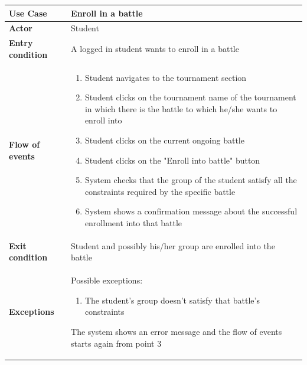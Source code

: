 \documentclass[../RASD.tex]{subfiles}
\begin{document}
        \begin{table}[ht]
            \begin{center}
                \begin{tabular}{|m{10em}|m{30em}|}
                \hline
                \textbf{Use Case} & Enroll in a battle\\
                \hline
                \textbf{Actor} & Student\\
                \hline
                \textbf{Entry condition} & A logged in student wants to enroll in a battle\\
                \hline
                \textbf{Flow of events} &
                    \begin{enumerate}
                        \item Student navigates to the tournament section
                        \item Student clicks on the tournament name of the tournament in which there is the battle to which he/she wants to enroll into
                        \item Student clicks on the current ongoing battle
                        \item Student clicks on the "Enroll into battle" button
                        \item System checks that the group of the student satisfy all the constraints required by the specific battle
                        \item System shows a confirmation message about the successful enrollment into that battle
                    \end{enumerate}\\
                \hline
                \textbf{Exit condition} & Student and possibly his/her group are enrolled into the battle\\
                \hline
                \textbf{Exceptions} & 
                    Possible exceptions:
                    \begin{enumerate}
                        \item The student's group doesn't satisfy that battle's constraints
                    \end{enumerate}
                    The system shows an error message and the flow of events starts again from point 3\\
                \hline
                \end{tabular}
            \end{center}
        \end{table}\newpage
\end{document}
